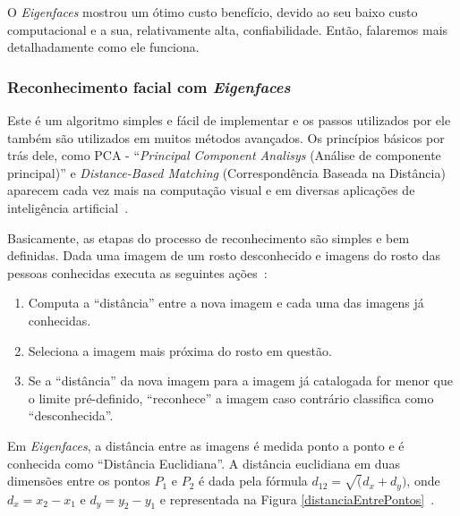 O \textit{Eigenfaces} mostrou um ótimo custo benefício, devido ao seu baixo custo computacional e a sua, relativamente alta, confiabilidade. Então, falaremos mais detalhadamente como ele funciona.

\subsubsection{Reconhecimento facial com \textit{Eigenfaces}}
\label{sec:eigenfaces}

Este é um algoritmo simples e fácil de implementar e os passos utilizados por ele também são utilizados em muitos métodos avançados. Os princípios básicos por trás dele, como PCA - ``\textit{Principal Component Analisys} (Análise de componente principal)'' e \textit{Distance-Based Matching} (Correspondência Baseada na Distância) aparecem cada vez mais na computação visual e em diversas aplicações de inteligência artificial~\cite{hewitt}.

Basicamente, as etapas do processo de reconhecimento são simples e bem definidas. Dada uma imagem de um rosto desconhecido e imagens do rosto das pessoas conhecidas executa as seguintes ações~\cite{hewitt}:

	\begin{enumerate}
		\item Computa a ``distância'' entre a nova imagem e cada uma das imagens já conhecidas.
		\item Seleciona a imagem mais próxima do rosto em questão.
		\item Se a ``distância'' da nova imagem para a imagem já catalogada for menor que o limite pré-definido, ``reconhece'' a imagem caso contrário classifica como ``desconhecida''.
	\end{enumerate}

Em \textit{Eigenfaces}, a distância entre as imagens é medida ponto a ponto e é conhecida como ``Distância Euclidiana''. A distância euclidiana em duas dimensões entre os pontos $P_1$ e $P_2$ é dada pela fórmula $\displaystyle d_{12} = \sqrt(d_{x} + d_{y})$, onde $\displaystyle d_x = x_2 - x_1$ e $\displaystyle d_y = y_2-y_1$ e representada na Figura \ref{distanciaEntrePontos}~\cite{hewitt}.

